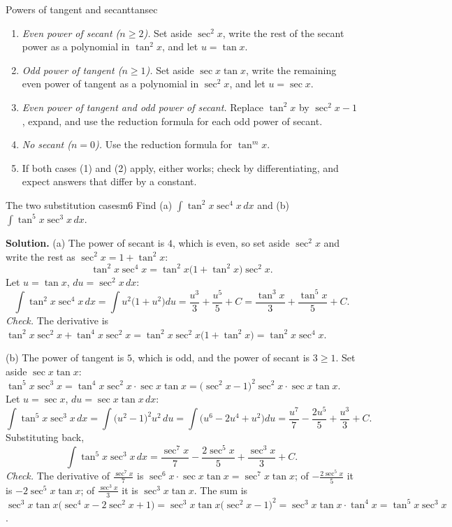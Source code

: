 \documentclass[11pt]{article}
\begin{document}
\begin{proc}{Powers of tangent and secant}{tansec}
\begin{enumerate}[nosep]
  \item \emph{Even power of secant ($n\ge2$).} Set aside $\sec^2x$, write the rest of the secant power as a polynomial in $\tan^2x$, and let $u=\tan x$.
  \item \emph{Odd power of tangent ($n\ge1$).} Set aside $\sec x\tan x$, write the remaining even power of tangent as a polynomial in $\sec^2x$, and let $u=\sec x$.
  \item \emph{Even power of tangent and odd power of secant.} Replace $\tan^2x$ by $\sec^2x-1$, expand, and use the reduction formula for each odd power of secant.
  \item \emph{No secant ($n=0$).} Use the reduction formula for $\tan^mx$.
  \item If both cases (1) and (2) apply, either works; check by differentiating, and expect answers that differ by a constant.
\end{enumerate}
\end{proc}

\begin{exmp}{The two substitution cases}{m6}
Find (a) $\int\tan^2x\sec^4x\,dx$ and (b) $\int\tan^5x\sec^3x\,dx$.

\textbf{Solution.} (a) The power of secant is $4$, which is even, so set aside $\sec^2x$ and write the rest as $\sec^2x=1+\tan^2x$:
\[\tan^2x\sec^4x=\tan^2x\big(1+\tan^2x\big)\sec^2x .\]
Let $u=\tan x$, $du=\sec^2x\,dx$:
\[\int\tan^2x\sec^4x\,dx=\int u^2\big(1+u^2\big)du=\frac{u^3}3+\frac{u^5}5+C=\frac{\tan^3x}3+\frac{\tan^5x}5+C .\]
\emph{Check.} The derivative is $\tan^2x\sec^2x+\tan^4x\sec^2x=\tan^2x\sec^2x\big(1+\tan^2x\big)=\tan^2x\sec^4x$.

(b) The power of tangent is $5$, which is odd, and the power of secant is $3\ge1$. Set aside $\sec x\tan x$: $\tan^5x\sec^3x=\tan^4x\sec^2x\cdot\sec x\tan x=\big(\sec^2x-1\big)^2\sec^2x\cdot\sec x\tan x$. Let $u=\sec x$, $du=\sec x\tan x\,dx$:
\[\int\tan^5x\sec^3x\,dx=\int\big(u^2-1\big)^2u^2\,du=\int\big(u^6-2u^4+u^2\big)du=\frac{u^7}7-\frac{2u^5}5+\frac{u^3}3+C .\]
Substituting back,
\[\int\tan^5x\sec^3x\,dx=\frac{\sec^7x}7-\frac{2\sec^5x}5+\frac{\sec^3x}3+C .\]
\emph{Check.} The derivative of $\frac{\sec^7x}7$ is $\sec^6x\cdot\sec x\tan x=\sec^7x\tan x$; of $-\frac{2\sec^5x}5$ it is $-2\sec^5x\tan x$; of $\frac{\sec^3x}3$ it is $\sec^3x\tan x$. The sum is $\sec^3x\tan x\big(\sec^4x-2\sec^2x+1\big)=\sec^3x\tan x\big(\sec^2x-1\big)^2=\sec^3x\tan x\cdot\tan^4x=\tan^5x\sec^3x$.
\end{exmp}
\end{document}
